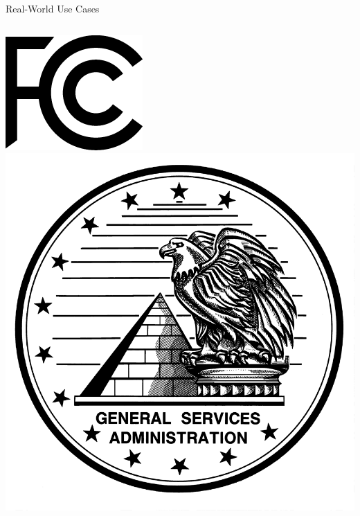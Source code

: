 \documentclass[compress]{beamer}
\begin{document}





\begin{frame}{Real-World Use Cases}

\begin{columns}
  \includegraphics[width=\linewidth]{topic_models/fcc-logo}
  \includegraphics[width=\linewidth]{topic_models/gsa}

\end{columns}
\end{frame}
\end{document}
